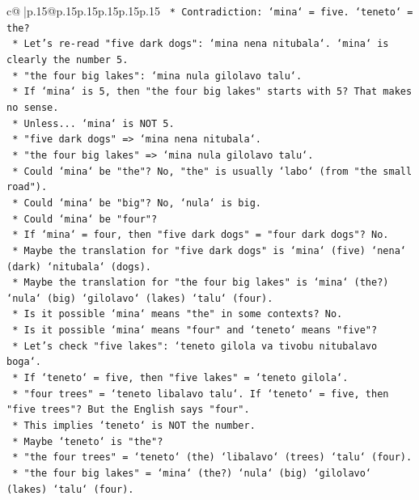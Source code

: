 \documentclass{article}
\begin{document}
{\begin{supertabular}{c@{$\;$}|p{.15\linewidth}@{}p{.15\linewidth}p{.15\linewidth}p{.15\linewidth}p{.15\linewidth}p{.15\linewidth}}
{{{\texttt{    *   Contradiction: `mina` = five. `teneto` = the?} \\
\texttt{    *   Let's re{-}read "five dark dogs": `mina nena nitubala`. `mina` is clearly the number 5.} \\
\texttt{    *   "the four big lakes": `mina nula gilolavo talu`.} \\
\texttt{    *   If `mina` is 5, then "the four big lakes" starts with 5? That makes no sense.} \\
\texttt{    *   Unless... `mina` is NOT 5.} \\
\texttt{    *   "five dark dogs" => `mina nena nitubala`.} \\
\texttt{    *   "the four big lakes" => `mina nula gilolavo talu`.} \\
\texttt{    *   Could `mina` be "the"? No, "the" is usually `labo` (from "the small road").} \\
\texttt{    *   Could `mina` be "big"? No, `nula` is big.} \\
\texttt{    *   Could `mina` be "four"?} \\
\texttt{    *   If `mina` = four, then "five dark dogs" = "four dark dogs"? No.} \\
\texttt{    *   Maybe the translation for "five dark dogs" is `mina` (five) `nena` (dark) `nitubala` (dogs).} \\
\texttt{    *   Maybe the translation for "the four big lakes" is `mina` (the?) `nula` (big) `gilolavo` (lakes) `talu` (four).} \\
\texttt{    *   Is it possible `mina` means "the" in some contexts? No.} \\
\texttt{    *   Is it possible `mina` means "four" and `teneto` means "five"?} \\
\texttt{    *   Let's check "five lakes": `teneto gilola va tivobu nitubalavo boga`.} \\
\texttt{    *   If `teneto` = five, then "five lakes" = `teneto gilola`.} \\
\texttt{    *   "four trees" = `teneto libalavo talu`. If `teneto` = five, then "five trees"? But the English says "four".} \\
\texttt{    *   This implies `teneto` is NOT the number.} \\
\texttt{    *   Maybe `teneto` is "the"?} \\
\texttt{    *   "the four trees" = `teneto` (the) `libalavo` (trees) `talu` (four).} \\
\texttt{    *   "the four big lakes" = `mina` (the?) `nula` (big) `gilolavo` (lakes) `talu` (four).} \\
}}}
\end{supertabular}}
\end{document}
